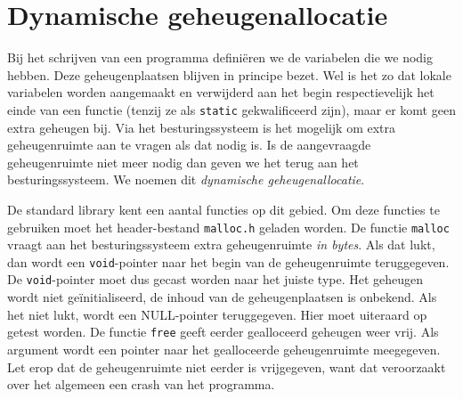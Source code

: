 %
%
%
%
%
%
%
%




\section{Dynamische geheugenallocatie}
\label{sec:dynamischegeheugenallocatie}
Bij het schrijven van een programma definiëren we de variabelen die we nodig hebben. Deze geheugenplaatsen blijven in principe bezet. Wel is het zo dat lokale variabelen worden aangemaakt en verwijderd aan het begin respectievelijk het einde van een functie (tenzij ze als \texttt{static} gekwalificeerd zijn), maar er komt geen extra geheugen bij. Via het besturingssysteem is het mogelijk om extra geheugenruimte aan te vragen als dat nodig is. Is de aangevraagde geheugenruimte niet meer nodig dan geven we het terug aan het besturingssysteem. We noemen dit \textsl{dynamische geheugenallocatie}.

De standard library kent een aantal functies op dit gebied. Om deze functies te gebruiken moet het header-bestand \texttt{malloc.h} geladen worden. De functie \texttt{malloc} vraagt aan het besturingssysteem extra geheugenruimte \textsl{in bytes}. Als dat lukt, dan wordt een \texttt{void}-pointer naar het begin van de geheugenruimte teruggegeven. De \texttt{void}-pointer moet dus gecast worden naar het juiste type. Het geheugen wordt niet geïnitialiseerd, de inhoud van de geheugenplaatsen is onbekend. Als het niet lukt, wordt een NULL-pointer teruggegeven. Hier moet uiteraard op getest worden. De functie \texttt{free} geeft eerder gealloceerd geheugen weer vrij. Als argument wordt een pointer naar het gealloceerde geheugenruimte meegegeven. Let erop dat de geheugenruimte niet eerder is vrijgegeven, want dat veroorzaakt over het algemeen een crash van het programma.


